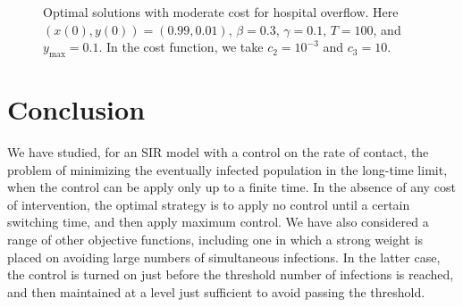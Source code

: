 \documentclass[english,12pt,letter]{article}
\newcommand{\ymax}{y_\text{max}}
\begin{document}
\begin{figure}
    \centering
    \caption{Optimal solutions with moderate cost for hospital overflow.  Here $(x(0),y(0)) = (0.99,0.01)$, $\beta=0.3$, $\gamma=0.1$, $T=100$,
        and $\ymax=0.1$.
        In the cost function, we take $c_2=10^{-3}$ and $c_3=10$.\label{fig:min_hosp_2}}
\end{figure}

\section{Conclusion}
We have studied, for an SIR model with a control on the rate of contact, the
problem of minimizing the eventually infected population in the long-time limit,
when the control can be apply only up to a finite time.  In the absence of any
cost of intervention, the optimal strategy is to apply no control until a
certain switching time, and then apply maximum control.  We have also considered
a range of other objective functions, including one in which a strong weight is
placed on avoiding large numbers of simultaneous infections.  In the latter case,
the control is turned on just before the threshold number of infections is reached,
and then maintained at a level just sufficient to avoid passing the threshold.
\end{document}
